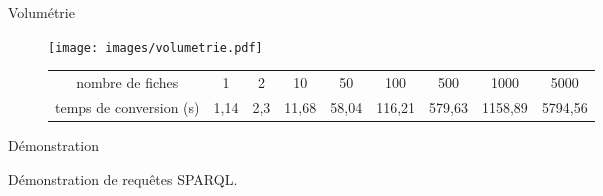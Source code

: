 \begin{frame}{Volumétrie}

\begin{figure}
    \centering
    \texttt{[image: images/volumetrie.pdf]}
    \caption{Transformation de fiches distinctes}
\begin{tiny}
\begin{table}[h]
\begin{tabular}{|c|c|c|c|c|c|c|c|c|}
\cline{1-9}
nombre de fiches & 1 & 2 & 10 & 50 & 100 & 500 & 1000 & 5000\\ \cline{1-9}
temps de conversion (s) & 1,14 & 2,3 & 11,68 & 58,04 & 116,21 & 579,63 & 1158,89 & 5794,56 \\ \cline{1-9}
\end{tabular}
\end{table}
\end{tiny}
\tablenameUn{}
  \end{figure}

\end{frame}

\begin{frame}{Démonstration}

Démonstration de requêtes SPARQL.
\centering
{}

\end{frame}
